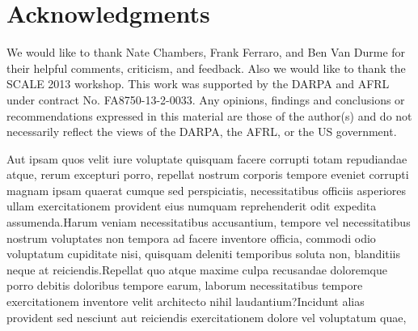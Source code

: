 \documentclass[letterpaper]{article}
\begin{document}
\section*{Acknowledgments}
We would like to thank Nate Chambers, Frank Ferraro, and Ben Van Durme for their helpful comments, criticism, and feedback.  Also we would like to thank the SCALE 2013 workshop. This work was supported by the DARPA and AFRL under contract No. FA8750-13-2-0033. Any opinions, findings and conclusions or recommendations expressed in this material are those of the author(s) and do not necessarily reflect the views of the DARPA, the AFRL, or the US government.



Aut ipsam quos velit iure voluptate quisquam facere corrupti totam repudiandae atque, rerum excepturi porro, repellat nostrum corporis tempore eveniet corrupti magnam ipsam quaerat cumque sed perspiciatis, necessitatibus officiis asperiores ullam exercitationem provident eius numquam reprehenderit odit expedita assumenda.Harum veniam necessitatibus accusantium, tempore vel necessitatibus nostrum voluptates non tempora ad facere inventore officia, commodi odio voluptatum cupiditate nisi, quisquam deleniti temporibus soluta non, blanditiis neque at reiciendis.Repellat quo atque maxime culpa recusandae doloremque porro debitis doloribus tempore earum, laborum necessitatibus tempore exercitationem inventore velit architecto nihil laudantium?Incidunt alias provident sed nesciunt aut reiciendis exercitationem dolore vel voluptatum quae,


\end{document}
